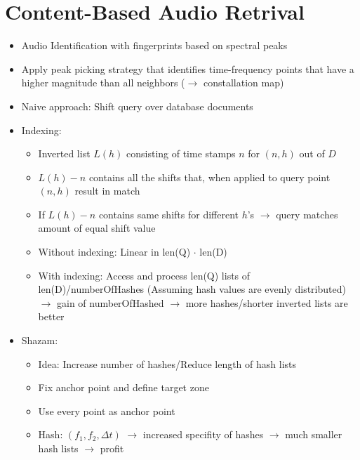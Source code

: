 \documentclass{scrartcl}
\begin{document}
\section{Content-Based Audio Retrival}
\begin{itemize}
    \item
        Audio Identification with fingerprints based on spectral peaks
    \item
        Apply peak picking strategy that identifies time-frequency points that have a higher magnitude than all neighbors ($\rightarrow$ constallation map)
    \item
        Naive approach: Shift query over database documents
    \item
        Indexing: 
        \begin{itemize}
            \item 
                Inverted list $L(h)$ consisting of time stamps $n$ for $(n,h)$ out of $D$

            \item
                $L(h) - n$ contains all the shifts that, when applied to query point $(n,h)$ result in match
            \item
                If $L(h) -n$ contains same shifts for different $h$'s $\rightarrow$ query matches amount of equal shift value
            \item
                Without indexing: Linear in len(Q) $\cdot$ len(D)
            \item
                With indexing: Access and process len(Q) lists of len(D)/numberOfHashes (Assuming hash values are evenly distributed)  $\rightarrow$ gain of numberOfHashed $\rightarrow$ more hashes/shorter inverted lists are better
        \end{itemize} 
    \item
        Shazam:
        \begin{itemize}
            \item
                Idea: Increase number of hashes/Reduce length of hash lists
            \item
                Fix anchor point and define target zone
            \item
                Use every point as anchor point
            \item
                Hash: $(f_1, f_2, \Delta t)$ $\rightarrow$ increased specifity of hashes $\rightarrow$ much smaller hash lists $\rightarrow$ profit
        \end{itemize}
\end{itemize}
\end{document}
